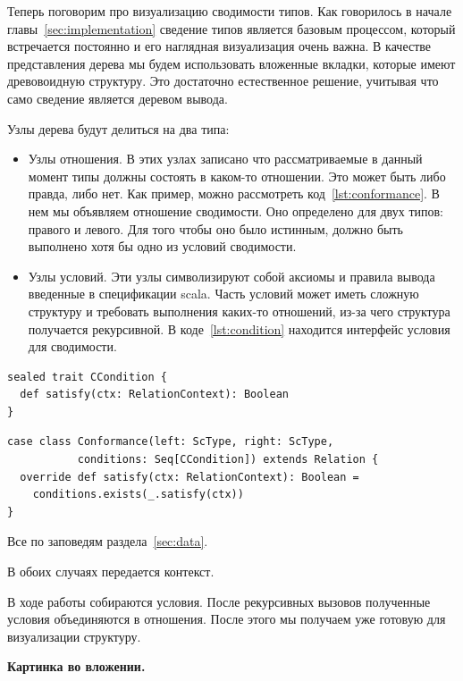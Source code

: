 Теперь поговорим про визуализацию сводимости типов.
Как говорилось в начале главы~\ref{sec:implementation} сведение типов является
базовым процессом, который встречается постоянно и его наглядная визуализация
очень важна.
В качестве представления дерева мы будем использовать вложенные вкладки,
которые имеют древовоидную структуру.
Это достаточно естественное решение, учитывая что само сведение является
деревом вывода.

Узлы дерева будут делиться на два типа:
\begin{itemize}
  \item Узлы отношения.
  В этих узлах записано что рассматриваемые в данный момент
  типы должны состоять в каком-то отношении.
  Это может быть либо правда, либо нет.
  Как пример, можно рассмотреть код~\ref{lst:conformance}.
  В нем мы объявляем отношение сводимости. Оно определено для двух типов:
  правого и левого.
  Для того чтобы оно было истинным, должно быть выполнено хотя бы одно из
  условий сводимости.
  \item Узлы условий.
  Эти узлы символизируют собой аксиомы и правила вывода введенные в спецификации
  scala.
  Часть условий может иметь сложную структуру и требовать выполнения каких-то
  отношений, из-за чего структура получается рекурсивной.
  В коде~\ref{lst:condition} находится интерфейс условия для сводимости.
\end{itemize}


\begin{lstlisting}[caption={Узел условия},label={lst:condition}]
sealed trait CCondition {
  def satisfy(ctx: RelationContext): Boolean
}
\end{lstlisting}

\begin{lstlisting}[caption={Узел отношения},label={lst:conformance}]
case class Conformance(left: ScType, right: ScType,
           conditions: Seq[CCondition]) extends Relation {
  override def satisfy(ctx: RelationContext): Boolean =
    conditions.exists(_.satisfy(ctx))
}
\end{lstlisting}

Все по заповедям раздела~\ref{sec:data}.

В обоих случаях передается контекст.

В ходе работы собираются условия.
После рекурсивных вызовов полученные условия объединяются в отношения.
После этого мы получаем уже готовую для визуализации структуру.

\textbf{Картинка во вложении.}

